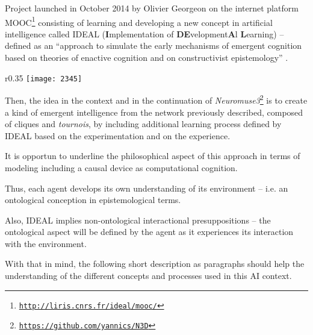 Project launched in October 2014 by Olivier Georgeon on the internet platform MOOC\footnote{\href{http://liris.cnrs.fr/ideal/mooc/}{\texttt{\scriptsize http://liris.cnrs.fr/ideal/mooc/}}\label{noteideal}} consisting of learning and developing a new concept in artificial intelligence called IDEAL (\textbf{I}mplementation of \textbf{DE}velopment\textbf{A}l \textbf{L}earning) -- defined as an ``approach to simulate the early mechanisms of emergent cognition based on theories of enactive cognition and on constructivist epistemology'' \citep{ger}.

\begin{wrapfigure}{r}{0.35\textwidth}
\vspace{-5pt}
   \hspace{-5pt} 
   \texttt{[image: 2345]}
  \vspace{-20pt}
\end{wrapfigure}

\bigskip

Then, the idea in the context and in the continuation of \textsl{Neuromuse3}\footnote{\href{https://github.com/yannics/N3D}{\texttt{\scriptsize https://github.com/yannics/N3D}}} is to create a kind of emergent intelligence from the network previously described, composed of cliques and \textit{tournois}, by including additional learning process defined by IDEAL based on the experimentation and on the experience. 

\bigskip

It is opportun to underline the philosophical aspect of this approach in terms of modeling including a causal device as computational cognition.

Thus, each agent develops its own understanding of its environment -- i.e. an ontological conception in epistemological terms.

Also, IDEAL implies non-ontological interactional presuppositions -- the ontological aspect will be defined by the agent as it experiences its interaction with the environment.

\bigskip

With that in mind, the following short description as paragraphs should help the understanding of the different concepts and processes used in this AI context.

